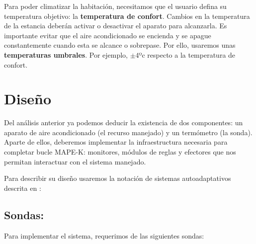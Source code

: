 
Para poder climatizar la habitación, necesitamos que el usuario defina su temperatura objetivo: la \textbf{temperatura de confort}. Cambios en la temperatura de la estancia deberán activar o desactivar el aparato para alcanzarla. Es importante evitar que el aire acondicionado se encienda y se apague constantemente cuando esta se alcance o sobrepase. Por ello, usaremos unas \textbf{temperaturas umbrales}. Por ejemplo, $\pm 4$ºc respecto a la temperatura de confort.

\section{Diseño}

Del análisis anterior ya podemos deducir la existencia de dos componentes: un aparato de aire acondicionado (el recurso manejado) y un termómetro (la sonda). Aparte de ellos, deberemos implementar la infraestructura necesaria para completar bucle MAPE-K: monitores, módulos de reglas y efectores que nos permitan interactuar con el sistema manejado.

Para describir su diseño usaremos la notación de sistemas autoadaptativos descrita en \cite{fonsEspecificacionSistemasAutoadaptativos2021}:

\subsection{Sondas:}

Para implementar el sistema, requerimos de las siguientes sondas:

